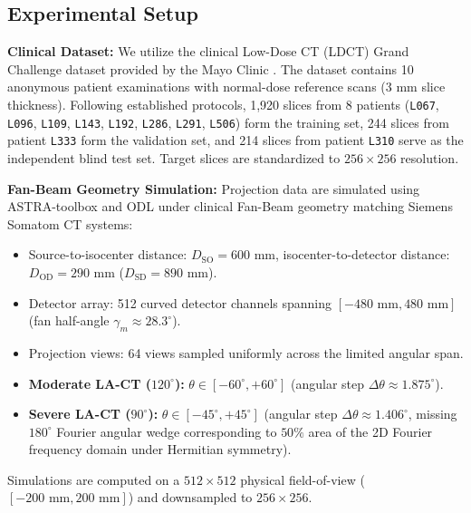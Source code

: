 \documentclass[runningheads]{llncs}
\begin{document}
\subsection{Experimental Setup}
\noindent \textbf{Clinical Dataset:} We utilize the clinical Low-Dose CT (LDCT) Grand Challenge dataset provided by the Mayo Clinic \cite{mccollough2016low}. The dataset contains 10 anonymous patient examinations with normal-dose reference scans ($3\text{ mm}$ slice thickness). Following established protocols, 1,920 slices from 8 patients (\texttt{L067}, \texttt{L096}, \texttt{L109}, \texttt{L143}, \texttt{L192}, \texttt{L286}, \texttt{L291}, \texttt{L506}) form the training set, 244 slices from patient \texttt{L333} form the validation set, and 214 slices from patient \texttt{L310} serve as the independent blind test set. Target slices are standardized to $256 \times 256$ resolution.

\noindent \textbf{Fan-Beam Geometry Simulation:} Projection data are simulated using ASTRA-toolbox and ODL under clinical Fan-Beam geometry matching Siemens Somatom CT systems:
\begin{itemize}
    \item Source-to-isocenter distance: $D_{\text{SO}} = 600\text{ mm}$, isocenter-to-detector distance: $D_{\text{OD}} = 290\text{ mm}$ ($D_{\text{SD}} = 890\text{ mm}$).
    \item Detector array: 512 curved detector channels spanning $[-480\text{ mm}, 480\text{ mm}]$ (fan half-angle $\gamma_m \approx 28.3^\circ$).
    \item Projection views: 64 views sampled uniformly across the limited angular span.
    \item \textbf{Moderate LA-CT ($120^\circ$):} $\theta \in [-60^\circ, +60^\circ]$ (angular step $\Delta\theta \approx 1.875^\circ$).
    \item \textbf{Severe LA-CT ($90^\circ$):} $\theta \in [-45^\circ, +45^\circ]$ (angular step $\Delta\theta \approx 1.406^\circ$, missing $180^\circ$ Fourier angular wedge corresponding to $50\%$ area of the 2D Fourier frequency domain under Hermitian symmetry).
\end{itemize}
Simulations are computed on a $512 \times 512$ physical field-of-view ($[-200\text{ mm}, 200\text{ mm}]$) and downsampled to $256 \times 256$.
\end{document}
